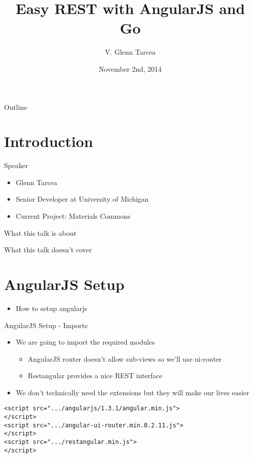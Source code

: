 \documentclass[presentation]{beamer}
\author{V. Glenn Tarcea}
\date{November 2nd, 2014}
\title{Easy REST with AngularJS and Go}
\begin{document}
\maketitle
\begin{frame}{Outline}
\tableofcontents
\end{frame}


\section{Introduction}
\label{sec-1}

\begin{frame}[label=sec-1-1]{Speaker}
\begin{itemize}
\item Glenn Tarcea
\item Senior Developer at University of Michigan
\item Current Project: Materials Commons
\end{itemize}
\end{frame}

\begin{frame}[label=sec-1-2]{What this talk is about}
\end{frame}

\begin{frame}[label=sec-1-3]{What this talk doesn't cover}
\end{frame}

\section{AngularJS Setup}
\label{sec-2}
\begin{itemize}
\item How to setup angularjs
\end{itemize}

\begin{frame}[fragile,label=sec-2-1]{AngularJS Setup - Imports}
 \begin{itemize}
\item We are going to import the required modules
\begin{itemize}
\item AngularJS router doesn't allow sub-views so we'll use ui-router
\item Restangular provides a nice REST interface
\end{itemize}
\item We don't technically need the extensions but they will make our lives easier
\end{itemize}
\begin{verbatim}
<script src=".../angularjs/1.3.1/angular.min.js">
</script>
<script src=".../angular-ui-router.min.0.2.11.js">
</script>
<script src=".../restangular.min.js">
</script>
\end{verbatim}
\end{frame}
\end{document}
